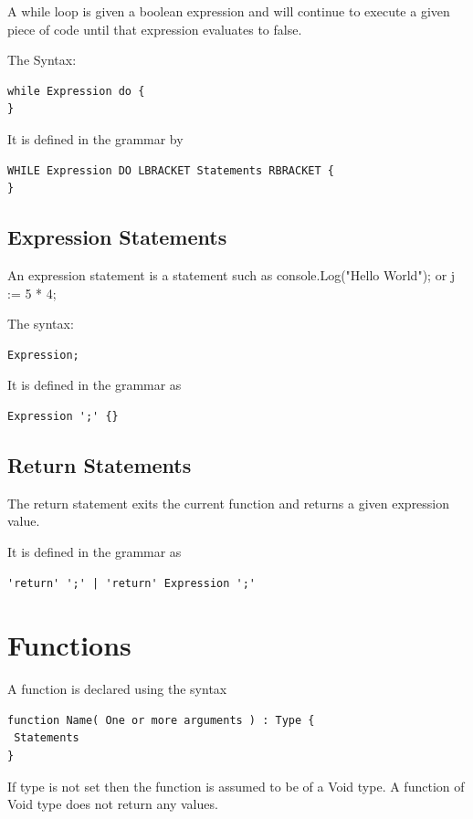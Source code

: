 \documentclass[]{final_report}
\begin{document}
A while loop is given a boolean expression and will continue to execute a given piece of code until that expression evaluates to false.

The Syntax: \begin{verbatim}
while Expression do {
}
\end{verbatim}

It is defined in the grammar by \begin{verbatim}
WHILE Expression DO LBRACKET Statements RBRACKET {
} 
\end{verbatim}

\subsection{Expression Statements}

An expression statement is a statement such as console.Log("Hello World"); or j := 5 * 4;

The syntax: \begin{verbatim}Expression;\end{verbatim}

It is defined in the grammar as \begin{verbatim}Expression ';' {}\end{verbatim}

\subsection{Return Statements}

The return statement exits the current function and returns a given expression value. 

It is defined in the grammar as
\begin{verbatim}
'return' ';' | 'return' Expression ';'
\end{verbatim}

\section{Functions}

A function is declared using the syntax

\begin{verbatim}
function Name( One or more arguments ) : Type {
 Statements
}
\end{verbatim}

If type is not set then the function is assumed to be of a Void type. A function of Void type does not return any values.
\end{document}
